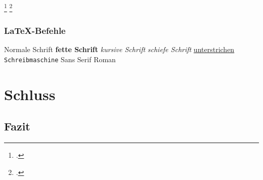 \Blindtext\footcite[Vgl. ][34]{Digitaloekonomie}
\blinditemize
\blindtext\footcite[Vgl. ][511]{Tanenbaum2016}

\subsubsection{LaTeX-Befehle}
 \textnormal{Normale Schrift} 
 \textbullet \textbf{fette Schrift} 
 \textbullet \textit{kursive Schrift} 
 \textbullet \textsl{schiefe Schrift} 
 \textbullet \underline{unterstrichen} 
 \textbullet \texttt{Schreib\-ma\-schi\-ne} 
 \textbullet \textsf{Sans Serif} 
 \textbullet \textrm{Roman} 

\section{Schluss}
\subsection{Fazit}
\Blindtext
